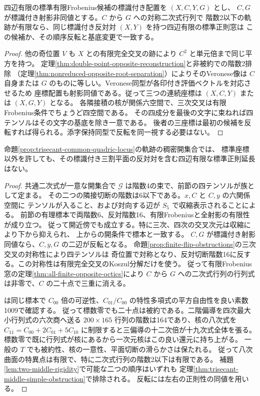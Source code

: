 \begin{lemma}\label{lem:two-middle-rigidity}
四辺有限の標準有限Frobenius候補の標識付き配置を $(X,C,Y,G)$ とし、
$C,G$ が標識付き射影非同値とする。$C$ から $G$ への対称二次式行列で
階数2以下の軌跡が有限なら、同じ標識付き反対対 $(X,Y)$ を持つ四辺有限の標準正則窓は
この候補か、その順序反転と基底変更で一致する。
\end{lemma}
\begin{proof}
他の奇位置 $V$ も $X$ との有限完全交叉の跡により $C^2$ と単元倍まで同じ平方を持つ。
定理\ref{thm:double-point-opposite-reconstruction}と非被約での階数2排除
（定理\ref{thm:nonreduced-opposite-root-separation}）によりそのVeronese像は
$C$ 自身または $G$ のものに等しい。Veronese同型が各印付き評価ベクトルを対応させるため
座標配置も射影同値である。従って三つの連続座標は $(X,C,Y)$ または $(X,G,Y)$ となる。
各隣接積の核が関係六空間で、三次交叉は有限Frobenius条件でちょうど四空間である。
その四成分を最後の文字に束ねれば四テンソルはその文字の基底を除き一意である。
後者の三座標は最初の候補を反転すれば得られる。添字保持同型で反転を同一視する必要はない。
\end{proof}

\begin{theorem}\label{thm:general-common-quadric-trisecant-exclusion}
命題\ref{prop:trisecant-common-quadric-locus}の軌跡の稠密開集合では、
標準座標以外を許しても、その標識付き三割平面の反対対を含む四辺有限な標準正則延長はない。
\end{theorem}
\begin{proof}
共通二次式が一意な開集合で $\mathcal G$ は階数4の束で、前節の四テンソルが族として定まる。
その二つの隣接切断の階数は6以下である。$x,C$ と $C,y$ の六関係空間に
テンソルが入ること、および対向する辺が $S_5$ で収縮表示されることによる。
前節の有理標本で両階数6、反対階数16、有限Frobeniusと全射影の有限性が成り立つ。
従って開近傍でも成立する。特に三次、四次の交叉次元は収縮により下から抑えられ、
上からの開条件で標本と一致する。
$C,G$ が標識付き射影同値なら、$C,y,G$ の二辺が反転となる。
命題\ref{prop:finite-flip-obstructions}の三次交叉の対称性により四テンソルは
奇位置で対称となり、反対切断階数16に反する。この対称性は有限完全交叉のKoszul分解だけを使う。
従って有限Frobenius窓の定理\ref{thm:all-finite-opposite-octics}により
$C$ から $G$ への二次式行列の行列式は非零で、$C$ の二十点で三重に消える。

 は同じ標本で
$C_{00}$ 倍の可逆性、$C_{01}/C_{00}$ の特性多項式の平方自由性を良い素数1009で確認する。
従って標数零でも二十点は被約である。二階偏導を四次最大小行列式の六次商へ送る
$200\times165$ 行列の階数は164であり、核の八次式を
$C_{11}=C_{00}+2C_{01}+5C_{10}$ に制限すると三偏導の十二次倍が十九次式全体を張る。
標数零で既に行列式が核にあるから一次元核はこの良い還元に持ち上がる。
一般の $T$ でも被約性、核の一意性、平面切断の滑らかさは保たれる。
従って八次曲面の特異点は有限で、特に二次式行列の階数2以下は有限である。
補題\ref{lem:two-middle-rigidity}で可能な二つの順序はいずれも
定理\ref{thm:trisecant-middle-simple-obstruction}で排除される。
反転には左右の正則性の同値を用いる。
\end{proof}
